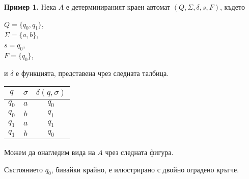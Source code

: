 \documentclass[openany]{book}
\begin{document}
    \textbf{Пример 1.} Нека $A$ е детерминираният краен автомат $(Q, \Sigma, \delta, s, F)$, където \\
    \begin{center}
        $Q = \{q_0, q_1\}$, \\
        $\Sigma = \{a,b\}$, \\
        $s = q_0$, \\
        $F = \{q_0\}$,
    \end{center}

    и $\delta$ е функцията, представена чрез следната талбица.

    \vspace{5pt} 

    \begin{center}
        \begin{tabular}{ c c c } 
         \hline
         $q$ & $\sigma$ & $\delta(q,\sigma)$ \\
         \hline 
         $q_0$ & $a$ & $q_0$ \\ 
         $q_0$ & $b$ & $q_1$ \\ 
         $q_1$ & $a$ & $q_1$ \\
         $q_1$ & $b$ & $q_0$ \\
         \hline
        \end{tabular}
    \end{center}

    \vspace{5pt}

    Можем да онагледим вида на $A$ чрез следната фигура.

    \vspace{5pt}

    \begin{center}
    \end{center}

    \vspace{5pt}

    Състоянието $q_0$, бивайки крайно, е илюстрирано с двойно оградено кръгче.
\end{document}
